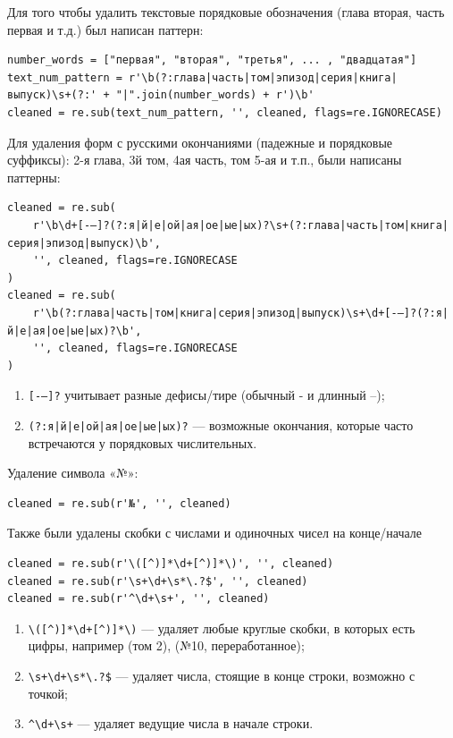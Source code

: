 \documentclass[coursework]{SCWorks}
\begin{document}
    Для того чтобы удалить текстовые порядковые обозначения (глава вторая, часть первая и т.д.) был написан паттерн:

    \begin{verbatim}
number_words = ["первая", "вторая", "третья", ... , "двадцатая"]
text_num_pattern = r'\b(?:глава|часть|том|эпизод|серия|книга|выпуск)\s+(?:' + "|".join(number_words) + r')\b'
cleaned = re.sub(text_num_pattern, '', cleaned, flags=re.IGNORECASE)
    \end{verbatim}

    Для удаления форм с русскими окончаниями (падежные и порядковые суффиксы): 2-я глава, 3й том, 4ая часть, том 5-ая и т.п., были написаны паттерны:

    \begin{verbatim}
cleaned = re.sub(
    r'\b\d+[-–]?(?:я|й|е|ой|ая|ое|ые|ых)?\s+(?:глава|часть|том|книга|серия|эпизод|выпуск)\b',
    '', cleaned, flags=re.IGNORECASE
)
cleaned = re.sub(
    r'\b(?:глава|часть|том|книга|серия|эпизод|выпуск)\s+\d+[-–]?(?:я|й|е|ая|ое|ые|ых)?\b',
    '', cleaned, flags=re.IGNORECASE
)
    \end{verbatim}

    \begin{enumerate}
        \item \verb|[-–]?| учитывает разные дефисы/тире (обычный - и длинный –);
        \item \verb~(?:я|й|е|ой|ая|ое|ые|ых)?~ — возможные окончания, которые часто встречаются у порядковых числительных.
    \end{enumerate}

    Удаление символа «№»:
    \begin{verbatim}
cleaned = re.sub(r'№', '', cleaned)
    \end{verbatim}

    Также были удалены скобки с числами и одиночных чисел на конце/начале
    \begin{verbatim}
cleaned = re.sub(r'\([^)]*\d+[^)]*\)', '', cleaned)
cleaned = re.sub(r'\s+\d+\s*\.?$', '', cleaned)
cleaned = re.sub(r'^\d+\s+', '', cleaned)
    \end{verbatim}

    \begin{enumerate}
        \item \verb|\([^)]*\d+[^)]*\)| — удаляет любые круглые скобки, в которых есть цифры, например (том 2), (№10, переработанное);
        \item \verb|\s+\d+\s*\.?$| — удаляет числа, стоящие в конце строки, возможно с точкой;
        \item \verb|^\d+\s+| — удаляет ведущие числа в начале строки.
    \end{enumerate}
\end{document}
